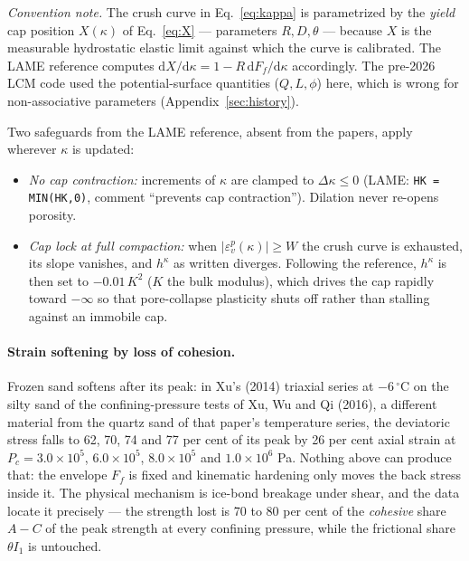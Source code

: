 \documentclass[12pt]{article}
\begin{document}
\emph{Convention note.} The crush curve in Eq.~\eqref{eq:kappa} is
parametrized by the \emph{yield} cap position $X(\kappa)$ of
Eq.~\eqref{eq:X} --- parameters $R, D, \theta$ --- because $X$ is the
measurable hydrostatic elastic limit against which the curve is
calibrated. The LAME reference computes
$\mathrm{d}X/\mathrm{d}\kappa = 1 - R\,\mathrm{d}F_f/\mathrm{d}\kappa$
accordingly. The pre-2026 LCM code used the potential-surface
quantities ($Q, L, \phi$) here, which is wrong for non-associative
parameters (Appendix~\ref{sec:history}).

Two safeguards from the LAME reference, absent from the papers,
apply wherever $\kappa$ is updated:
\begin{itemize}
\item \emph{No cap contraction:} increments of $\kappa$ are clamped
      to $\Delta\kappa \le 0$ (LAME:
      \texttt{HK = MIN(HK,0)}, comment ``prevents cap
      contraction''). Dilation never re-opens porosity.
\item \emph{Cap lock at full compaction:} when
      $|\varepsilon_v^p(\kappa)| \ge W$ the crush curve is exhausted,
      its slope vanishes, and $h^\kappa$ as written diverges.
      Following the reference, $h^\kappa$ is then set to
      $-0.01\,K^2$ ($K$ the bulk modulus), which drives the cap
      rapidly toward $-\infty$ so that pore-collapse plasticity shuts off rather
      than stalling against an immobile cap.
\end{itemize}

\paragraph{Strain softening by loss of cohesion.}
Frozen sand softens after its peak: in Xu's (2014) triaxial series
at $-6\,^\circ$C on the silty sand of the confining-pressure tests of
Xu, Wu and Qi (2016), a different material from the quartz sand of
that paper's temperature series, the deviatoric stress falls to 62,
70, 74 and 77 per cent of its peak by 26 per cent axial strain at
$P_c = 3.0\times10^{5}$, $6.0\times10^{5}$, $8.0\times10^{5}$ and
$1.0\times10^{6}$ Pa. Nothing above can produce that: the envelope
$F_f$ is fixed and kinematic hardening only moves the back stress
inside it. The physical mechanism is ice-bond breakage under shear,
and the data locate it precisely --- the strength lost is 70 to 80
per cent of the \emph{cohesive} share $A - C$ of the peak strength at
every confining pressure, while the frictional share $\theta I_1$ is
untouched.
\end{document}
